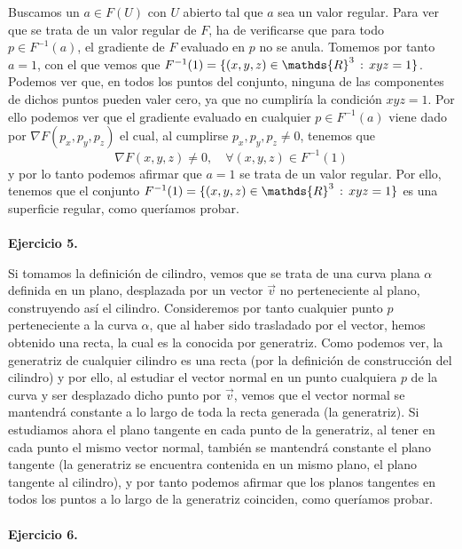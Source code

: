 \documentclass[fleqn]{article}
\def\R{\mathds{R}}
\begin{document}
        Buscamos un $a \in F(U)$ con $U$ abierto tal que $a$ sea un valor regular. Para ver que se trata de un valor regular de $F$, ha de verificarse
        que para todo $p \in F^{-1}(a)$, el gradiente de $F$ evaluado en $p$ no se anula. Tomemos por 
        tanto $a=1$, con el que vemos que $F^{-1}(1)=\{(x,y,z) \in \R^3 \thinspace : \thinspace xyz=1\}$. Podemos ver que, en todos los puntos del conjunto,
        ninguna de las componentes de dichos puntos pueden valer cero, ya que no cumpliría la condición $xyz = 1$. Por ello podemos ver que el gradiente evaluado en cualquier
        $p \in F^{-1}(a)$ viene dado por $\nabla F(p_x,p_y,p_z)$ el cual, al cumplirse $p_x,p_y,p_z \neq 0$, tenemos que 
        $$\nabla F(x,y,z)\neq 0, \quad \forall (x,y,z) \in F^{-1}(1)$$
        y por lo tanto podemos afirmar que $a=1$ se trata de un valor regular.
        Por ello, tenemos que el conjunto $F^{-1}(1)=\{(x,y,z) \in \R^3 \thinspace : \thinspace xyz=1\}$ es una superficie regular, como queríamos probar.\\ \\


        \textbf{Ejercicio 5. } 
        
        Si tomamos la definición de cilindro, vemos que se trata de una curva plana $\alpha$ definida en un plano, desplazada por un 
        vector $\vec{v}$ no perteneciente al plano, construyendo así el cilindro. Consideremos por tanto cualquier punto $p$ perteneciente a la curva $\alpha$, que al haber sido 
        trasladado por el vector, hemos obtenido una recta, la cual es la conocida por generatriz. Como podemos ver, la generatriz de cualquier cilindro
        es una recta (por la definición de construcción del cilindro) y por ello, al estudiar el vector normal en un punto cualquiera $p$ de la curva y ser desplazado
        dicho punto por $\vec{v}$, vemos que el vector normal se mantendrá constante a lo largo de toda la recta generada (la generatriz). Si estudiamos 
        ahora el plano tangente en cada punto de la generatriz, al tener en cada punto el mismo vector normal, también se mantendrá constante el plano
        tangente (la generatriz se encuentra contenida en un mismo plano, el plano tangente al cilindro), y por tanto podemos afirmar que los planos tangentes 
        en todos los puntos a lo largo de la generatriz coinciden, como queríamos probar.\\ \\


        \textbf{Ejercicio 6. } 
        
\end{document}

